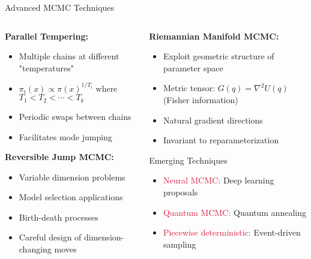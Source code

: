 \documentclass[aspectratio=169,11pt]{beamer}
\begin{document}
\begin{frame}{Advanced MCMC Techniques}
\begin{columns}
\begin{column}{0.5\textwidth}
\textbf{Parallel Tempering:}
\begin{itemize}
\item Multiple chains at different "temperatures"
\item $\pi_i(x) \propto \pi(x)^{1/T_i}$ where $T_1 < T_2 < \cdots < T_k$
\item Periodic swaps between chains
\item Facilitates mode jumping
\end{itemize}

\vspace{0.3cm}
\textbf{Reversible Jump MCMC:}
\begin{itemize}
\item Variable dimension problems
\item Model selection applications
\item Birth-death processes
\item Careful design of dimension-changing moves
\end{itemize}
\end{column}
\begin{column}{0.5\textwidth}
\textbf{Riemannian Manifold MCMC:}
\begin{itemize}
\item Exploit geometric structure of parameter space
\item Metric tensor: $G(q) = \nabla^2 U(q)$ (Fisher information)
\item Natural gradient directions
\item Invariant to reparameterization
\end{itemize}

\vspace{0.3cm}
\begin{block}{Emerging Techniques}
\begin{itemize}
\item \textcolor{crimson}{Neural MCMC:} Deep learning proposals
\item \textcolor{crimson}{Quantum MCMC:} Quantum annealing
\item \textcolor{crimson}{Piecewise deterministic:} Event-driven sampling
\end{itemize}
\end{block}
\end{column}
\end{columns}
\end{frame}
\end{document}
